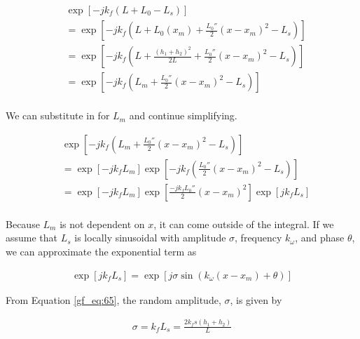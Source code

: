 \begin{equation}
\begin{aligned}
&\exp\left[-jk_f\left( L+L_0-L_s\right) \right]\\
&= \exp\left[-jk_f\left( L+L_0(x_m) + \frac{L_0''}{2}(x-x_m)^2-L_s\right) \right]\\
&= \exp\left[-jk_f\left( L+\frac{(h_1+h_2)^2}{2L} + \frac{L_0''}{2}(x-x_m)^2-L_s\right)\right]\\
&=\exp\left[-jk_f\left(L_m+\frac{L_0''}{2}(x-x_m)^2-L_s\right)\right]\\
\label{gf_eq:67}
\end{aligned}
\end{equation}
\renewcommand{\baselinestretch}{2} \small\normalsize

\noindent We can substitute in for $L_m$ and continue simplifying.

\begin{equation}
\begin{aligned}
&\exp\left[-jk_f\left(L_m+\frac{L_0''}{2}(x-x_m)^2-L_s\right)\right]\\
&=\exp\left[-jk_fL_m\right]\exp\left[-jk_f\left(\frac{L_0''}{2}(x-x_m)^2-L_s\right)\right]\\
&=\exp\left[-jk_fL_m\right]\exp\left[\frac{-jk_fL_0''}{2}(x-x_m)^2\right]\exp\left[jk_fL_s \right]\\
\label{gf_eq:67a}
\end{aligned}
\end{equation}
\renewcommand{\baselinestretch}{2} \small\normalsize

Because $L_m$ is not dependent on $x$, it can come outside of the integral. If we assume that $L_s$ is locally sinusoidal with amplitude $\sigma$, frequency $k_{\omega}$, and phase $\theta$, we can approximate the exponential term as 

\begin{equation}
\begin{aligned}
\exp\left[jk_fL_s\right] =\exp\left[j\sigma \sin\left(k_{\omega} (x-x_m) + \theta\right) \right]
\end{aligned}
\label{gf_eq:68}
\end{equation}
\renewcommand{\baselinestretch}{2} \small\normalsize

\noindent From Equation \ref{gf_eq:65}, the random amplitude, $\sigma$, is given by

\begin{equation}
\begin{aligned}
\sigma = k_fL_s = \frac{2k_fs(h_1+h_2)}{L}
\end{aligned}
\label{gf_eq:69}
\end{equation}
\renewcommand{\baselinestretch}{2} \small\normalsize


